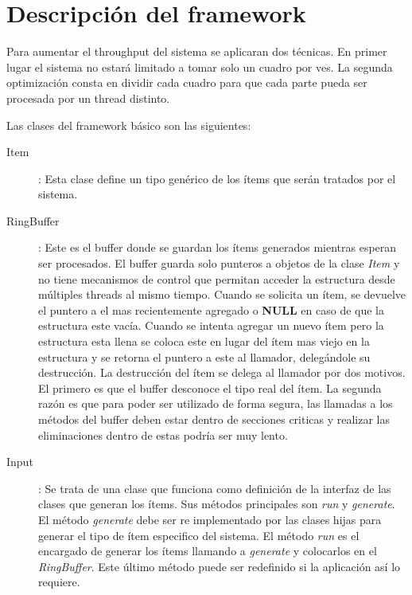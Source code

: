 
\section{Descripción del framework}

Para aumentar el throughput del sistema se aplicaran dos técnicas. En primer
lugar el sistema no estará limitado a tomar solo un cuadro por ves. La segunda
optimización consta en dividir cada cuadro para que cada parte pueda ser
procesada por un thread distinto.

Las clases del framework básico son las siguientes:

\begin{description}

\item[Item]: Esta clase define un tipo genérico de los ítems que serán tratados
	por el sistema.

\item[RingBuffer]: Este es el buffer donde se guardan los ítems generados
	mientras esperan ser procesados. El buffer guarda solo punteros a
	objetos de la clase \emph{Item} y no tiene mecanismos de control que
	permitan acceder la estructura desde múltiples threads al mismo tiempo.
	Cuando se solicita un ítem, se devuelve el puntero a el mas
	recientemente agregado o \textbf{NULL} en caso de que la estructura este
	vacía. Cuando se intenta agregar un nuevo ítem pero la estructura esta
	llena se coloca este en lugar del ítem mas viejo en la estructura y se
	retorna el puntero a este al llamador, delegándole su destrucción. La
	destrucción del ítem se delega al llamador por dos motivos. El primero
	es que el buffer desconoce el tipo real del ítem. La segunda razón es
	que para poder ser utilizado de forma segura, las llamadas a los métodos
	del buffer deben estar dentro de secciones criticas y realizar las
	eliminaciones dentro de estas podría ser muy lento.

\item[Input]: Se trata de una clase que funciona como definición de la interfaz
	de las clases que generan los ítems. Sus métodos principales son
	\emph{run} y \emph{generate}. El método \emph{generate} debe ser re
	implementado por las clases hijas para generar el tipo de ítem
	especifico del sistema. El método \emph{run} es el encargado de generar
	los ítems llamando a \emph{generate} y colocarlos en el
	\emph{RingBuffer}. Este último método puede ser redefinido si la
	aplicación así lo requiere.


\end{description}
